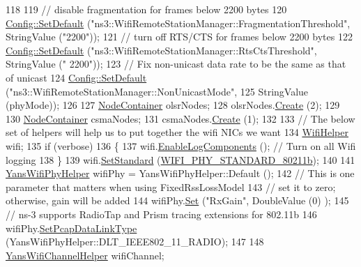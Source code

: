 \begin{DoxyCode}
118 
119   \textcolor{comment}{// disable fragmentation for frames below 2200 bytes}
120   \hyperlink{group__config_ga2e7882df849d8ba4aaad31c934c40c06}{Config::SetDefault} (\textcolor{stringliteral}{"ns3::WifiRemoteStationManager::FragmentationThreshold"}, 
      StringValue (\textcolor{stringliteral}{"2200"}));
121   \textcolor{comment}{// turn off RTS/CTS for frames below 2200 bytes}
122   \hyperlink{group__config_ga2e7882df849d8ba4aaad31c934c40c06}{Config::SetDefault} (\textcolor{stringliteral}{"ns3::WifiRemoteStationManager::RtsCtsThreshold"}, StringValue (\textcolor{stringliteral}{"
      2200"}));
123   \textcolor{comment}{// Fix non-unicast data rate to be the same as that of unicast}
124   \hyperlink{group__config_ga2e7882df849d8ba4aaad31c934c40c06}{Config::SetDefault} (\textcolor{stringliteral}{"ns3::WifiRemoteStationManager::NonUnicastMode"},
125                       StringValue (phyMode));
126 
127   \hyperlink{classns3_1_1NodeContainer}{NodeContainer} olsrNodes;
128   olsrNodes.\hyperlink{classns3_1_1NodeContainer_a787f059e2813e8b951cc6914d11dfe69}{Create} (2);
129 
130   \hyperlink{classns3_1_1NodeContainer}{NodeContainer} csmaNodes;
131   csmaNodes.\hyperlink{classns3_1_1NodeContainer_a787f059e2813e8b951cc6914d11dfe69}{Create} (1);
132 
133   \textcolor{comment}{// The below set of helpers will help us to put together the wifi NICs we want}
134   \hyperlink{classns3_1_1WifiHelper}{WifiHelper} wifi;
135   \textcolor{keywordflow}{if} (verbose)
136     \{
137       wifi.\hyperlink{classns3_1_1WifiHelper_a9dcf143d52642e94606a9e0f228da2d2}{EnableLogComponents} ();  \textcolor{comment}{// Turn on all Wifi logging}
138     \}
139   wifi.\hyperlink{classns3_1_1WifiHelper_aa54f3e61527ef8de318d310045bc5dfd}{SetStandard} (\hyperlink{group__wifi_gga1299834f4e1c615af3ca738033b76a49a77e1cc9f77a0bce8e2bc82cbef437b5a}{WIFI\_PHY\_STANDARD\_80211b});
140 
141   \hyperlink{classns3_1_1YansWifiPhyHelper}{YansWifiPhyHelper} wifiPhy =  YansWifiPhyHelper::Default ();
142   \textcolor{comment}{// This is one parameter that matters when using FixedRssLossModel}
143   \textcolor{comment}{// set it to zero; otherwise, gain will be added}
144   wifiPhy.\hyperlink{classns3_1_1WifiPhyHelper_a2527d6d7b29f717fd7436166c5f05f1a}{Set} (\textcolor{stringliteral}{"RxGain"}, DoubleValue (0) );
145   \textcolor{comment}{// ns-3 supports RadioTap and Prism tracing extensions for 802.11b}
146   wifiPhy.\hyperlink{classns3_1_1WifiPhyHelper_ae4b90e90f6e78a19c1b7fdf08b270218}{SetPcapDataLinkType} (YansWifiPhyHelper::DLT\_IEEE802\_11\_RADIO);
147 
148   \hyperlink{classns3_1_1YansWifiChannelHelper}{YansWifiChannelHelper} wifiChannel;

\end{DoxyCode}
